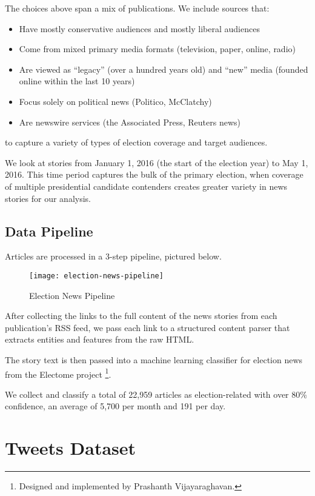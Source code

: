 The choices above span a mix of publications. We include sources that: 

\begin{itemize}
\item Have mostly conservative audiences and mostly liberal audiences \cite{PoliticalPolarization}
\item Come from mixed primary media formats (television, paper, online, radio)
\item Are viewed as ``legacy'' (over a hundred years old) and ``new'' media (founded online within the last 10 years)
\item Focus solely on political news (Politico, McClatchy)
\item Are newswire services (the Associated Press, Reuters news)
\end{itemize}
 
 to capture a variety of types of election coverage and target audiences.
 
 We look at stories from January 1, 2016 (the start of the election year) to May 1, 2016. This time period captures the bulk of the primary election, when coverage of multiple presidential candidate contenders creates greater variety in news stories for our analysis.
  
\subsection{Data Pipeline}

Articles are processed in a 3-step pipeline, pictured below.

\begin{figure}[H]  
\centering 
  \texttt{[image: election-news-pipeline]}  
  \caption{Election News Pipeline
    \label{fig:data-stack}}
\end{figure}

After collecting the links to the full content of the news stories from each publication's RSS feed, we pass each link to a structured content parser that extracts entities and features from the raw HTML.

The story text is then passed into a machine learning classifier for election news from the Electome project \footnote{Designed and implemented by Prashanth Vijayaraghavan.}. 


 We collect and classify a total of 22,959 articles as election-related with over 80\% confidence, an average of 5,700 per month and 191 per day.


\section{Tweets Dataset}


